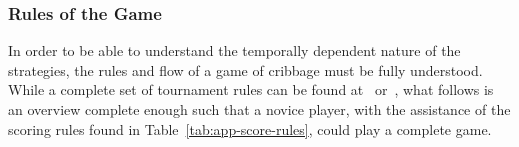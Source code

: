 
\subsubsection*{Rules of the Game}

In order to be able to understand the temporally dependent nature of the 
strategies, the rules and flow of a game of cribbage must be fully understood.
%
While a complete set of tournament rules can be found at~\cite{ACC_rules}
or~\cite{ACC_rulebook},
what follows is an overview complete enough such that a novice player,
with the assistance of the scoring rules found in Table~\ref{tab:app-score-rules},
could play a complete game.




